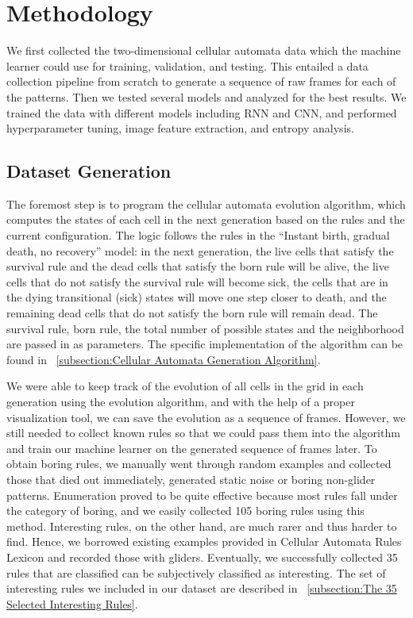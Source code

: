 \documentclass[12pt]{article}
\numberwithin{figure}{section} %
\begin{document}
\newpage
\section{Methodology}
We first collected the two-dimensional cellular automata data which the machine learner could use for training, validation, and testing. This entailed a data collection pipeline from scratch to generate a sequence of raw frames for each of the patterns. Then we tested several models and analyzed for the best results. We trained the data with different models including RNN and CNN, and performed hyperparameter tuning, image feature extraction, and entropy analysis. 

\subsection{Dataset Generation}
The foremost step is to program the cellular automata evolution algorithm, which computes the states of each cell in the next generation based on the rules and the current configuration. The logic follows the rules in the “Instant birth, gradual death, no recovery” model: in the next generation, the live cells that satisfy the survival rule and the dead cells that satisfy the born rule will be alive, the live cells that do not satisfy the survival rule will become sick, the cells that are in the dying transitional (sick) states will move one step closer to death, and the remaining dead cells that do not satisfy the born rule will remain dead. The survival rule, born rule, the total number of possible states and the neighborhood are passed in as parameters. The specific implementation of the algorithm can be found in ~\ref{subsection:Cellular Automata Generation Algorithm}. 

We were able to keep track of the evolution of all cells in the grid in each generation using the evolution algorithm, and with the help of a proper visualization tool, we can save the evolution as a sequence of frames. However, we still needed to collect known rules so that we could pass them into the algorithm and train our machine learner on the generated sequence of frames later. To obtain boring rules, we manually went through random examples and collected those that died out immediately, generated static noise or boring non-glider patterns. Enumeration proved to be quite effective because most rules fall under the category of boring, and we easily collected 105 boring rules using this method. Interesting rules, on the other hand, are much rarer and thus harder to find. Hence, we borrowed existing examples provided in Cellular Automata Rules Lexicon and recorded those with gliders. Eventually, we successfully collected 35 rules that are classified can be subjectively classified as interesting. The set of interesting rules we included in our dataset are described in ~\ref{subsection:The 35 Selected Interesting Rules}. 
\end{document}
